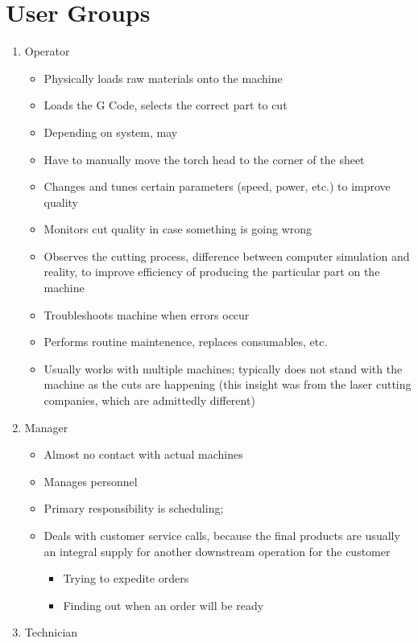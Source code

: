 \documentclass[12pt,letterpaper,titlepage]{article}
\newlength{\wideitemsep}
\let\olditem\item
\renewcommand{\item}{\setlength{\itemsep}{\wideitemsep}\olditem}
\begin{document}
\section{User Groups} \label{list:UserGroups}
\begin{enumerate}
\item Operator
\begin{itemize}
\item Physically loads raw materials onto the machine
\item Loads the G Code, selects the correct part to cut
\item Depending on system, may 
\item Have to manually move the torch head to the corner of the sheet
\item Changes and tunes certain parameters (speed, power, etc.) to improve quality
\item Monitors cut quality in case something is going wrong
\item Observes the cutting process, difference between computer simulation and reality, to improve efficiency of producing the particular part on the machine
\item Troubleshoots machine when errors occur
\item Performs routine maintenence, replaces consumables, etc.
\item Usually works with multiple machines; typically does not stand with the machine as the cuts are happening (this insight was from the laser cutting companies, which are admittedly different)
\end{itemize}
\item Manager
\begin{itemize}
\item Almost no contact with actual machines
\item Manages personnel
\item Primary responsibility is scheduling;
\item Deals with customer service calls, because the final products are usually an integral supply for another downstream operation for the customer
\begin{itemize}
\item Trying to expedite orders
\item Finding out when an order will be ready
\end{itemize}
\end{itemize}
\item Technician
\begin{itemize}

\end{itemize}
\end{enumerate}
\end{document}
